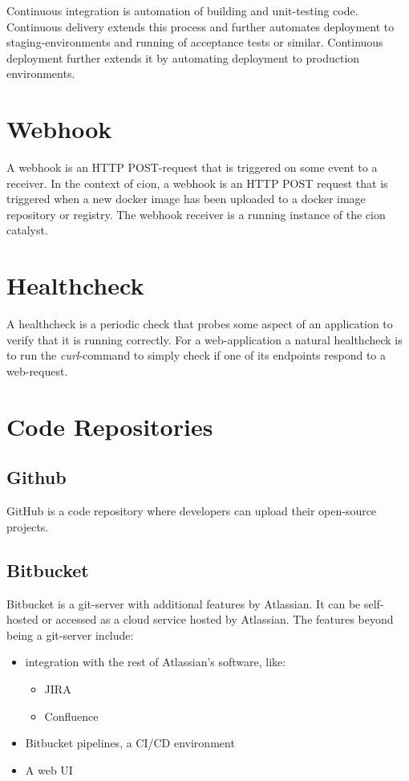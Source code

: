 Continuous integration is automation of building and unit-testing code. Continuous delivery extends this process and further automates deployment to staging-environments and running of acceptance tests or similar. Continuous deployment further extends it by automating deployment to production environments.

\section{Webhook}
A webhook is an HTTP POST-request that is triggered on some event to a receiver.
In the context of cion, a webhook is an HTTP POST request that is triggered when a new docker image has been uploaded to a docker image repository or registry. The webhook receiver is a running instance of the cion catalyst.

\section{Healthcheck}
A healthcheck is a periodic check that probes some aspect of an application to verify that it is running correctly. For a web-application a natural healthcheck is to run the \textit{curl}-command to simply check if one of its endpoints respond to a web-request.

\section{Code Repositories}

\subsection{Github}
GitHub is a code repository where developers can upload their open-source projects.

\subsection{Bitbucket}
Bitbucket is a git-server with additional features by Atlassian. It can be self-hosted or accessed as a cloud service hosted by Atlassian.
\newline
The features beyond being a git-server include:
\begin{itemize}
    \item integration with the rest of Atlassian’s software, like:
    \begin{itemize}
        \item JIRA
        \item Confluence
    \end{itemize}
    \item Bitbucket pipelines, a CI/CD environment
    \item A web UI
\end{itemize}

